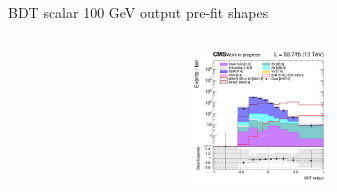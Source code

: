 \documentclass[8pt]{beamer}
\begin{document}
\begin{frame}{BDT scalar 100 GeV output pre-fit shapes}
\begin{columns}
\begin{column}{0.33\textwidth}
\begin{center}
     			\includegraphics[width=1.0\textwidth, height=100pt]{figs/2018/SmearSR-ttDM-scalar100/log_cratio_TTbar_topCR_ll_BDT_ttDM100_TTbar_BDT_output_scalar100_customBinsAttempt7.png}
    		\end{center}		
		\end{column}
\end{columns} \vfill
\end{frame}
\end{document}
